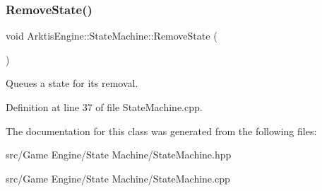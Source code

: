 \subsubsection{\texorpdfstring{RemoveState()}{RemoveState()}}
{\footnotesize\ttfamily void Arktis\+Engine\+::\+State\+Machine\+::\+Remove\+State (\begin{DoxyParamCaption}{ }\end{DoxyParamCaption})}



Queues a state for it\textquotesingle{}s removal. 

\begin{DoxyVerb}\end{DoxyVerb}
 

Definition at line 37 of file State\+Machine.\+cpp.


\begin{DoxyCode}{0}

\end{DoxyCode}


The documentation for this class was generated from the following files\+:\begin{DoxyCompactItemize}
\item 
src/\+Game Engine/\+State Machine/State\+Machine.\+hpp\item 
src/\+Game Engine/\+State Machine/State\+Machine.\+cpp\end{DoxyCompactItemize}
